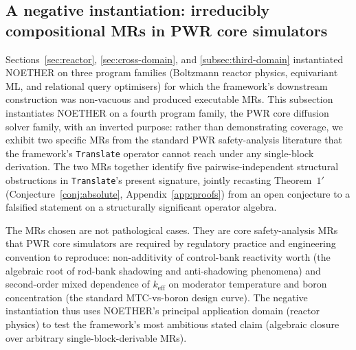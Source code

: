 \documentclass[acmsmall, screen]{acmart}
\begin{document}
\subsection{A negative instantiation: irreducibly compositional MRs in PWR core simulators}
\label{subsec:negative-pwr}

Sections~\ref{sec:reactor}, \ref{sec:cross-domain}, and \ref{subsec:third-domain} instantiated NOETHER on three program families (Boltzmann reactor physics, equivariant ML, and relational query optimisers) for which the framework's downstream construction was non-vacuous and produced executable MRs. This subsection instantiates NOETHER on a fourth program family, the PWR core diffusion solver family, with an inverted purpose: rather than demonstrating coverage, we exhibit two specific MRs from the standard PWR safety-analysis literature that the framework's \texttt{Translate} operator cannot reach under any single-block derivation. The two MRs together identify five pairwise-independent structural obstructions in \texttt{Translate}'s present signature, jointly recasting Theorem~$1'$ (Conjecture~\ref{conj:absolute}, Appendix~\ref{app:proofs}) from an open conjecture to a falsified statement on a structurally significant operator algebra.

The MRs chosen are not pathological cases. They are core safety-analysis MRs that PWR core simulators are required by regulatory practice and engineering convention to reproduce: non-additivity of control-bank reactivity worth (the algebraic root of rod-bank shadowing and anti-shadowing phenomena) and second-order mixed dependence of $k_{\mathrm{eff}}$ on moderator temperature and boron concentration (the standard MTC-vs-boron design curve). The negative instantiation thus uses NOETHER's principal application domain (reactor physics) to test the framework's most ambitious stated claim (algebraic closure over arbitrary single-block-derivable MRs).
\end{document}
